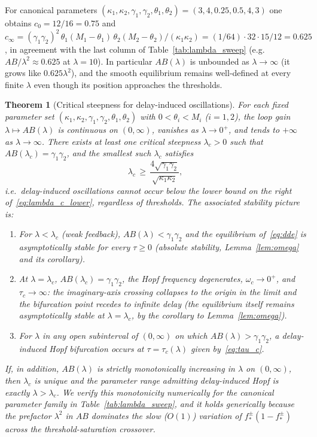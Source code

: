 \documentclass[sn-mathphys,Numbered]{sn-jnl}
\theoremstyle{thmstyleone}
\newtheorem{theorem}{Theorem}
\theoremstyle{thmstyletwo}
\theoremstyle{thmstylethree}
\begin{document}
For canonical parameters $(\kappa_1,\kappa_2,\gamma_1,\gamma_2,\theta_1,
\theta_2)=(3,4,0.25,0.5,4,3)$ one obtains $c_0=12/16=0.75$ and
$c_\infty=(\gamma_1\gamma_2)^2\,\theta_1(M_1{-}\theta_1)\,
\theta_2(M_2{-}\theta_2)/(\kappa_1\kappa_2)
=(1/64)\cdot 32\cdot 15/12=0.625$, in agreement with the
last column of Table~\ref{tab:lambda_sweep} (e.g.\ $AB/\lambda^2\approx
0.625$ at $\lambda=10$). In particular $AB(\lambda)$ is unbounded as
$\lambda\to\infty$ (it grows like $0.625\lambda^2$), and the smooth
equilibrium remains well-defined at every finite $\lambda$ even though
its position approaches the thresholds.

\begin{theorem}[Critical steepness for delay-induced oscillations]
\label{thm:lambda_critical}
For each fixed parameter set $(\kappa_1,\kappa_2,\gamma_1,\gamma_2,
\theta_1,\theta_2)$ with $0<\theta_i<M_i$ ($i=1,2$), the loop gain
$\lambda\mapsto AB(\lambda)$ is continuous on $(0,\infty)$, vanishes as
$\lambda\to 0^+$, and tends to $+\infty$ as $\lambda\to\infty$. There
exists at least one critical steepness $\lambda_c>0$ such that
$AB(\lambda_c)=\gamma_1\gamma_2$, and the smallest such $\lambda_c$
satisfies
\begin{equation}
\lambda_c \,\geq\, \frac{4\sqrt{\gamma_1\gamma_2}}
                       {\sqrt{\kappa_1\kappa_2}},
\label{eq:lambda_c_lower}
\end{equation}
i.e.\ delay-induced oscillations cannot occur below the lower bound
on the right of~\eqref{eq:lambda_c_lower}, regardless of thresholds.
The associated stability picture is:
\begin{enumerate}
  \item For $\lambda<\lambda_c$ \emph{(weak feedback)},
        $AB(\lambda)<\gamma_1\gamma_2$ and the equilibrium of~\eqref{eq:dde}
        is asymptotically stable for every $\tau\geq 0$ (absolute
        stability, Lemma~\ref{lem:omega} and its corollary).
  \item At $\lambda=\lambda_c$, $AB(\lambda_c)=\gamma_1\gamma_2$, the
        Hopf frequency degenerates, $\omega_c\to 0^+$, and
        $\tau_c\to\infty$: the imaginary-axis crossing collapses to the
        origin in the limit and the bifurcation point recedes to
        infinite delay (the equilibrium itself remains asymptotically
        stable at $\lambda=\lambda_c$, by the corollary to
        Lemma~\ref{lem:omega}).
  \item For $\lambda$ in any open subinterval of $(0,\infty)$ on which
        $AB(\lambda)>\gamma_1\gamma_2$, a delay-induced Hopf bifurcation
        occurs at $\tau=\tau_c(\lambda)$ given by~\eqref{eq:tau_c}.
\end{enumerate}
If, in addition, $AB(\lambda)$ is strictly monotonically increasing in
$\lambda$ on $(0,\infty)$, then $\lambda_c$ is unique and the parameter
range admitting delay-induced Hopf is exactly $\lambda>\lambda_c$. We
verify this monotonicity numerically for the canonical parameter family
in Table~\ref{tab:lambda_sweep}, and it holds generically because the
prefactor $\lambda^2$ in $AB$ dominates the slow ($O(1)$) variation of
$f^\pm_*(1-f^\pm_*)$ across the threshold-saturation crossover.
\end{theorem}
\end{document}
